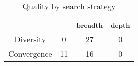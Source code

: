 \begin{table}
	\centering
	\caption{Quality by search strategy}
	\begin{tabular}{cccc}
		 & \hybrid & \theory\textsubscript{breadth} & \theory\textsubscript{depth}\\\midrule
		Diversity & 0 & 27 & 0 \\
		Convergence & 11 & 16 & 0
	\end{tabular}
	\label{tab:overallSearch}
	\vspace*{-0.2cm}
\end{table}